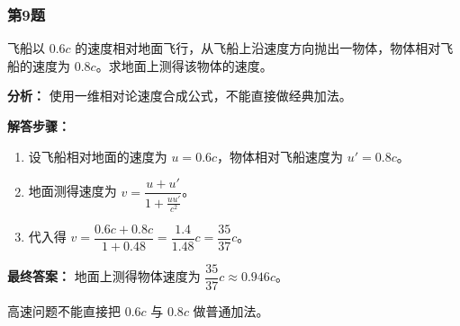 \documentclass[12pt,a4paper]{ctexart}
\begin{document}
\subsubsection*{第9题}
\begin{tcolorbox}[colback=gray!2!white,colframe=black!60,title={题目}]
飞船以 \(0.6c\) 的速度相对地面飞行，从飞船上沿速度方向抛出一物体，物体相对飞船的速度为 \(0.8c\)。求地面上测得该物体的速度。\par
\end{tcolorbox}
\begin{tcolorbox}[colback=blue!2!white,colframe=blue!55!black,title={完整答案}]
\textbf{分析：}
使用一维相对论速度合成公式，不能直接做经典加法。\par
\textbf{解答步骤：}
\begin{enumerate}
\item 设飞船相对地面的速度为 \(u=0.6c\)，物体相对飞船速度为 \(u'=0.8c\)。
\item 地面测得速度为 \(v=\dfrac{u+u'}{1+\frac{uu'}{c^2}}\)。
\item 代入得 \(v=\dfrac{0.6c+0.8c}{1+0.48}=\dfrac{1.4}{1.48}c=\dfrac{35}{37}c\)。
\end{enumerate}
\textbf{最终答案：}
地面上测得物体速度为 \(\dfrac{35}{37}c\approx 0.946c\)。\par
\end{tcolorbox}
\begin{tcolorbox}[colback=red!2!white,colframe=red!55!black,title={易错点}]
高速问题不能直接把 \(0.6c\) 与 \(0.8c\) 做普通加法。\par
\end{tcolorbox}
\end{document}
